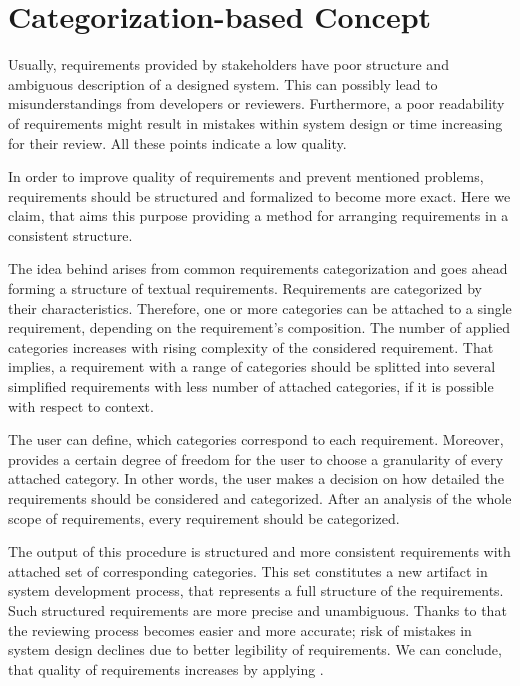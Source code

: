 \section{Categorization-based Concept}
\label{sec:cbc} 

Usually, requirements provided by stakeholders have poor structure and ambiguous description of a designed system. This can possibly lead to misunderstandings from developers or reviewers. Furthermore, a poor readability of requirements might result in mistakes within system design or time increasing for their review. All these points indicate a low quality. 

In order to improve quality of requirements and prevent mentioned problems, requirements should be structured and formalized to become more exact. Here we claim, that \cbc aims this purpose providing a method for arranging requirements in a consistent structure.

The idea behind \cc arises from common requirements categorization and goes ahead forming a structure of textual requirements. Requirements are categorized by their characteristics. Therefore, one or more categories can be attached to a single requirement, depending on the requirement's composition. The number of applied categories increases with rising complexity of the considered requirement. That implies, a requirement with a range of categories should be splitted into several simplified requirements with less number of attached categories, if it is possible with respect to context.

The user can define, which categories correspond to each requirement. Moreover, \cc provides a certain degree of freedom for the user to choose a granularity of every attached category. In other words, the user makes a decision on how detailed the requirements should be considered and categorized. After an analysis of the whole scope of requirements, every requirement should be categorized.  

The output of this procedure is structured and more consistent requirements with attached set of corresponding categories. This set constitutes a new artifact in system development process, that represents a full structure of the requirements. Such structured requirements are more precise and unambiguous. Thanks to that the reviewing process becomes easier and more accurate; risk of mistakes in system design declines due to better legibility of requirements. We can conclude, that quality of requirements increases by applying \cbc.

